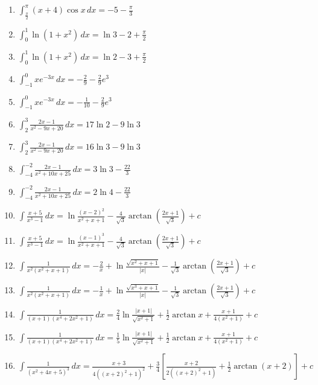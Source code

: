 \documentclass[11pt,a4paper]{article}
\begin{document}
\begin{enumerate}
\item $\displaystyle \int_{\frac{\pi}{2}}^{\pi} (x + 4)\cos x \, dx = -5 - \frac{\pi}{3}$
\item $\displaystyle \int_{0}^{1} \ln\left(1 + x^{2}\right) \, dx = \ln 3 - 2 + \frac{\pi}{2}$
\item $\displaystyle \int_{0}^{1} \ln\left(1 + x^{2}\right) \, dx = \ln 2 - 3 + \frac{\pi}{2}$
\item $\displaystyle \int_{-1}^{0} x e^{-3x} \, dx = -\frac{2}{9} - \frac{2}{9}e^{3}$
\item $\displaystyle \int_{-1}^{0} x e^{-3x} \, dx = -\frac{1}{10} - \frac{2}{9}e^{3}$
\item $\displaystyle \int_{2}^{3} \frac{2x - 1}{x^{2} - 9x + 20} \, dx = 17\ln 2 - 9\ln 3$
\item $\displaystyle \int_{2}^{3} \frac{2x - 1}{x^{2} - 9x + 20} \, dx = 16\ln 3 - 9\ln 3$
\item $\displaystyle \int_{-4}^{-2} \frac{2x - 1}{x^{2} + 10x + 25} \, dx = 3\ln 3 - \frac{22}{3}$
\item $\displaystyle \int_{-4}^{-2} \frac{2x - 1}{x^{2} + 10x + 25} \, dx = 2\ln 4 - \frac{22}{3}$
\item $\displaystyle \int \frac{x + 5}{x^{3} - 1} \, dx = \ln\frac{(x - 2)^{2}}{x^{2} + x + 1} - \frac{4}{\sqrt{3}}\arctan\left(\frac{2x + 1}{\sqrt{3}}\right) + c$
\item $\displaystyle \int \frac{x + 5}{x^{3} - 1} \, dx = \ln\frac{(x - 1)^{3}}{x^{2} + x + 1} - \frac{4}{\sqrt{3}}\arctan\left(\frac{2x + 1}{\sqrt{3}}\right) + c$
\item $\displaystyle \int \frac{1}{x^{2}\left(x^{2} + x + 1\right)} \, dx = -\frac{2}{x} + \ln\frac{\sqrt{x^{2} + x + 1}}{|x|} - \frac{1}{\sqrt{3}}\arctan\left(\frac{2x + 1}{\sqrt{3}}\right) + c$
\item $\displaystyle \int \frac{1}{x^{2}\left(x^{2} + x + 1\right)} \, dx = -\frac{1}{x} + \ln\frac{\sqrt{x^{3} + x + 1}}{|x|} - \frac{1}{\sqrt{3}}\arctan\left(\frac{2x + 1}{\sqrt{3}}\right) + c$
\item $\displaystyle \int \frac{1}{(x + 1)\left(x^{4} + 2x^{2} + 1\right)} \, dx = \frac{2}{4}\ln\frac{|x + 1|}{\sqrt{x^{2} + 1}} + \frac{1}{2}\arctan x + \frac{x + 1}{4\left(x^{2} + 1\right)} + c$
\item $\displaystyle \int \frac{1}{(x + 1)\left(x^{4} + 2x^{2} + 1\right)} \, dx = \frac{1}{5}\ln\frac{|x + 1|}{\sqrt{x^{2} + 1}} + \frac{1}{2}\arctan x + \frac{x + 1}{4\left(x^{2} + 1\right)} + c$
\item $\displaystyle \int \frac{1}{\left(x^{2} + 4x + 5\right)^{3}} \, dx = \frac{x + 3}{4\left((x + 2)^{2} + 1\right)^{2}} + \frac{3}{4}\left[\frac{x + 2}{2\left((x + 2)^{2} + 1\right)} + \frac{1}{2}\arctan(x + 2)\right] + c$

\end{enumerate}
\end{document}
